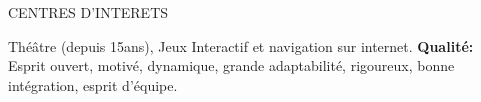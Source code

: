 \documentclass[a4paper]{article}
\begin{document}
\textcolor[gray]{0.6}{{\Large  CENTRES D'INTERETS}}




\noindent 
\newline
\newline
\hspace*{0.5cm} Théâtre (depuis 15ans), Jeux Interactif et navigation sur internet.
\newline
\newline
\hspace*{0.5cm} \textbf{Qualité:}\hspace*{0.5cm} Esprit ouvert, motivé, dynamique, grande adaptabilité, rigoureux, bonne intégration,
\newline
\hspace*{0.6cm}esprit d'équipe.
\end{document}
